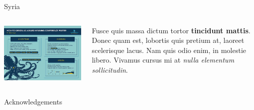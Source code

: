 \documentclass[final]{beamer}
\newlength{\twocolwid}
\begin{document}
\begin{frame}[t]
\begin{columns}[t]
\begin{column}{\twocolwid}
\begin{block}{Syria}
    \begin{columns}[onlytextwidth]
        \begin{column}{.45\textwidth}
            \includegraphics[width=0.8\linewidth]{design_guidelines.png} 
        \end{column}
        \begin{column}{.55\textwidth}
            Fusce quis massa dictum tortor \textbf{tincidunt mattis}. Donec quam est, lobortis quis pretium at, laoreet scelerisque lacus. Nam quis odio enim, in molestie libero. Vivamus cursus mi at \textit{nulla elementum sollicitudin}.
        \end{column}
    \end{columns}
\end{block}



\begin{block}{Acknowledgements}

\small{} \\

\end{block}



\end{column}
\end{columns}
\end{frame}
\end{document}
